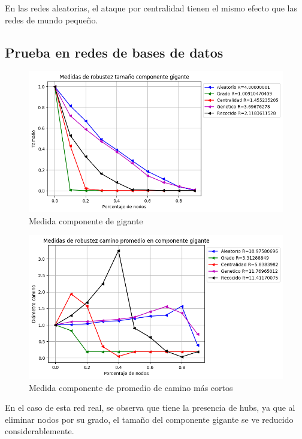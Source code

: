 En las redes aleatorias, el ataque por centralidad tienen el mismo efecto que las redes de mundo pequeño.


\subsection{Prueba en redes de bases de datos}

\begin{figure}[H]
    \centering
    \includegraphics[scale=0.7]{Capitulo5Robustez/imagenes/grafica_GC20180508_020345Celengs.png}
    \caption{Medida componente de gigante}
\end{figure}


\begin{figure}[H]
    \centering
    \includegraphics[scale=0.7]{Capitulo5Robustez/imagenes/grafica_APL20180508_020345Celengs.png}
    \caption{Medida componente de promedio de camino más cortos}
\end{figure}


En el caso de esta red real, se observa que tiene la presencia de hubs, ya que al eliminar nodos por su grado, el tamaño del componente gigante se ve reducido considerablemente.

